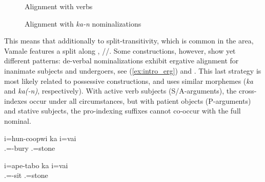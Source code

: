 	
\begin{figure}
\begin{floatrow}
\captionsetup{margin=.05\linewidth}
	{\caption{Alignment with verbs}
	\label{fig:intro_alignment2}}

	{\caption{Alignment with \textit{ka-n} nominalizations}
	\label{fig:intro_alignment3}}
\end{floatrow}
\end{figure}

This means that additionally to split-transitivity, which is common in the area, Vamale features a split along , \slash{}\slash{}. Some constructions, however, show yet different patterns: de-verbal nominalizations exhibit ergative alignment for inanimate subjects and undergoers, see (\ref{ex:intro_erg}) and . This last strategy is most likely related to possessive constructions, and uses similar morphemes (\textit{ka} and \textit{ka(-n)}, respectively). %
With active verb subjects (S/A-arguments), the cross-indexes occur under all circumstances, but with patient objects (P-arguments) and stative subjects, the pro-indexing suffixes cannot co-occur with the full nominal. 

\ea \label{ex:intro_erg}
\gll i=hun-coopwi ka i=vai\\
 .=-bury  .=stone\\
\glt {}
\z


\ea
\gll i=ape-tabo ka i=vai\\
 .=-sit  .=stone\\
\glt {}
\z

